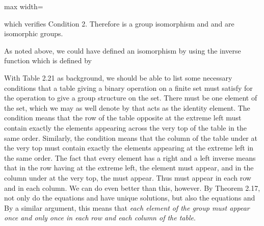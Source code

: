 \documentclass[11pt,oneside]{article}
\begin{document}
\BookNarrativetrue

\begin{BookBody}

\begin{center}\begin{adjustbox}{max width=\linewidth}\end{adjustbox}\end{center}

\noindent which verifies Condition 2. Therefore  is a group isomorphism and  and  are isomorphic groups.

As noted above, we could have defined an isomorphism by using the inverse function  which is defined by \BookEnd{\blacktriangle}


\noindent With Table 2.21 as background, we should be able to list some necessary conditions that a table giving a binary operation on a finite set must satisfy for the operation to give a group structure on the set. There must be one element of the set, which we may as well denote by  that acts as the identity element. The condition  means that the row of the table opposite  at the extreme left must contain exactly the elements appearing across the very top of the table in the same order. Similarly, the condition  means that the column of the table under  at the very top must contain exactly the elements appearing at the extreme left in the same order. The fact that every element  has a right and a left inverse means that in the row having  at the extreme left, the element  must appear, and in the column under  at the very top, the  must appear. Thus  must appear in each row and in each column. We can do even better than this, however. By Theorem 2.17, not only do the equations  and  have unique solutions, but also the equations  and  By a similar argument, this means that\textit{ each element}  \textit{of the group must appear once and only once in each} \textit{row and each column of the table}.


\end{BookBody}
\end{document}
